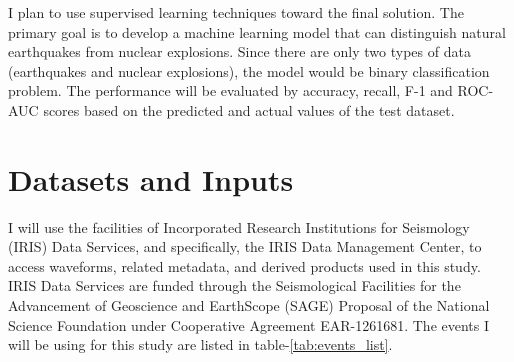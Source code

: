 \documentclass[12pt]{article}
\begin{document}
    I plan to use supervised learning techniques toward the final solution. The primary goal is to develop a machine learning model that can distinguish natural earthquakes from nuclear explosions. Since there are only two types of data (earthquakes and nuclear explosions), the model would be binary classification problem. The performance will be evaluated by accuracy, recall, F-1 and ROC-AUC scores based on the predicted and actual values of the test dataset.

    \section{Datasets and Inputs}
    I will use the facilities of Incorporated Research Institutions for Seismology (IRIS) Data Services, and specifically, the IRIS Data Management Center, to access waveforms, related metadata, and derived products used in this study. IRIS Data Services are funded through the Seismological Facilities for the Advancement of Geoscience and EarthScope (SAGE) Proposal of the National Science Foundation under Cooperative Agreement EAR-1261681. The events I will be using for this study are listed in table-\ref{tab:events_list}. 
\end{document}
